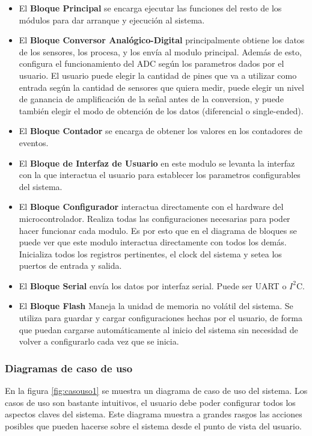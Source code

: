 \documentclass{article}
\theoremstyle{definition}
\theoremstyle{remark}
\begin{document}
\begin{itemize}
  \item El \textbf{Bloque Principal} se encarga ejecutar las funciones del resto de los módulos para dar arranque y ejecución al sistema.
  \item El \textbf{Bloque Conversor Anal\'ogico-Digital} principalmente obtiene los datos de los sensores, los procesa, y los envía al modulo principal. Además de esto, configura el funcionamiento del ADC según los parametros dados por el usuario. El usuario puede elegir la cantidad de pines que va a utilizar como entrada según la cantidad de sensores que quiera medir, puede elegir un nivel de ganancia de amplificación de la señal antes de la conversion, y puede también elegir el modo de obtención de los datos (diferencial o single-ended).
  \item El \textbf{Bloque Contador} se encarga de obtener los valores en los contadores de eventos.
  \item El \textbf{Bloque de Interfaz de Usuario} en este modulo se levanta la interfaz con la que interactua el usuario para establecer los parametros configurables del sistema.
  \item El \textbf{Bloque Configurador} interactua directamente con el hardware del microcontrolador. Realiza todas las configuraciones necesarias para poder hacer funcionar cada modulo. Es por esto que en el diagrama de bloques se puede ver que este modulo interactua directamente con todos los demás. Inicializa todos los registros pertinentes, el clock del sistema y setea los puertos de entrada y salida.
  \item El \textbf{Bloque Serial} envía los datos por interfaz serial. Puede ser UART o $I^{2}$C.
  \item El \textbf{Bloque Flash} Maneja la unidad de memoria no volátil del sistema. Se utiliza para guardar y cargar configuraciones hechas por el usuario, de forma que puedan cargarse automáticamente al inicio del sistema sin necesidad de volver a configurarlo cada vez que se inicia.
\end{itemize}


\subsubsection{Diagramas de caso de uso} %
\label{ssub:diagramas_de_caso_de_uso}

En la figura \ref{fig:casouso1} se muestra un diagrama de caso de uso del sistema. Los casos de uso son bastante intuitivos, el usuario debe poder configurar todos los aspectos claves del sistema. Este diagrama muestra a grandes rasgos las acciones posibles que pueden hacerse sobre el sistema desde el punto de vista del usuario.
\end{document}
